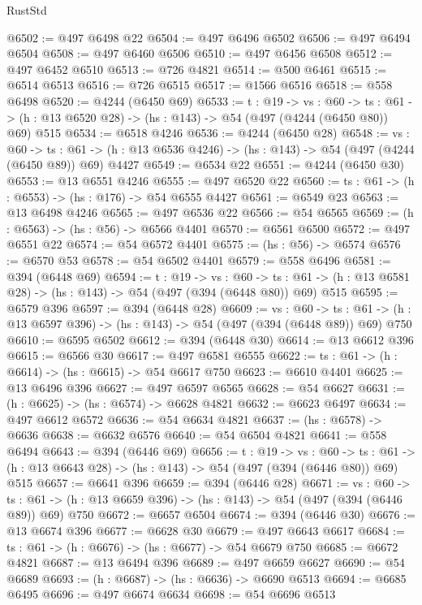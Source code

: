 \begin{lexlean}{RustStd}
\begin{coremodule}
@6502 := @497 @6498 @22
@6504 := @497 @6496 @6502
@6506 := @497 @6494 @6504
@6508 := @497 @6460 @6506
@6510 := @497 @6456 @6508
@6512 := @497 @6452 @6510
@6513 := @726 @4821
@6514 := @500 @6461
@6515 := @6514 @6513
@6516 := @726 @6515
@6517 := @1566 @6516
@6518 := @558 @6498
@6520 := @4244 (@6450 @69)
@6533 := {t : @19} ->
  {vs : @60} ->
  {ts : @61} -> (h : @13 @6520 @28) -> (hs : @143) -> @54 (@497 (@4244 (@6450 @80)) @69) @515
@6534 := @6518 @4246
@6536 := @4244 (@6450 @28)
@6548 := {vs : @60} ->
  {ts : @61} -> (h : @13 @6536 @4246) -> (hs : @143) -> @54 (@497 (@4244 (@6450 @89)) @69) @4427
@6549 := @6534 @22
@6551 := @4244 (@6450 @30)
@6553 := @13 @6551 @4246
@6555 := @497 @6520 @22
@6560 := {ts : @61} -> (h : @6553) -> (hs : @176) -> @54 @6555 @4427
@6561 := @6549 @23
@6563 := @13 @6498 @4246
@6565 := @497 @6536 @22
@6566 := @54 @6565
@6569 := (h : @6563) -> (hs : @56) -> @6566 @4401
@6570 := @6561 @6500
@6572 := @497 @6551 @22
@6574 := @54 @6572 @4401
@6575 := (hs : @56) -> @6574
@6576 := @6570 @53
@6578 := @54 @6502 @4401
@6579 := @558 @6496
@6581 := @394 (@6448 @69)
@6594 := {t : @19} ->
  {vs : @60} ->
  {ts : @61} -> (h : @13 @6581 @28) -> (hs : @143) -> @54 (@497 (@394 (@6448 @80)) @69) @515
@6595 := @6579 @396
@6597 := @394 (@6448 @28)
@6609 := {vs : @60} ->
  {ts : @61} -> (h : @13 @6597 @396) -> (hs : @143) -> @54 (@497 (@394 (@6448 @89)) @69) @750
@6610 := @6595 @6502
@6612 := @394 (@6448 @30)
@6614 := @13 @6612 @396
@6615 := @6566 @30
@6617 := @497 @6581 @6555
@6622 := {ts : @61} -> (h : @6614) -> (hs : @6615) -> @54 @6617 @750
@6623 := @6610 @4401
@6625 := @13 @6496 @396
@6627 := @497 @6597 @6565
@6628 := @54 @6627
@6631 := (h : @6625) -> (hs : @6574) -> @6628 @4821
@6632 := @6623 @6497
@6634 := @497 @6612 @6572
@6636 := @54 @6634 @4821
@6637 := (hs : @6578) -> @6636
@6638 := @6632 @6576
@6640 := @54 @6504 @4821
@6641 := @558 @6494
@6643 := @394 (@6446 @69)
@6656 := {t : @19} ->
  {vs : @60} ->
  {ts : @61} -> (h : @13 @6643 @28) -> (hs : @143) -> @54 (@497 (@394 (@6446 @80)) @69) @515
@6657 := @6641 @396
@6659 := @394 (@6446 @28)
@6671 := {vs : @60} ->
  {ts : @61} -> (h : @13 @6659 @396) -> (hs : @143) -> @54 (@497 (@394 (@6446 @89)) @69) @750
@6672 := @6657 @6504
@6674 := @394 (@6446 @30)
@6676 := @13 @6674 @396
@6677 := @6628 @30
@6679 := @497 @6643 @6617
@6684 := {ts : @61} -> (h : @6676) -> (hs : @6677) -> @54 @6679 @750
@6685 := @6672 @4821
@6687 := @13 @6494 @396
@6689 := @497 @6659 @6627
@6690 := @54 @6689
@6693 := (h : @6687) -> (hs : @6636) -> @6690 @6513
@6694 := @6685 @6495
@6696 := @497 @6674 @6634
@6698 := @54 @6696 @6513

\end{coremodule}
\end{lexlean}
